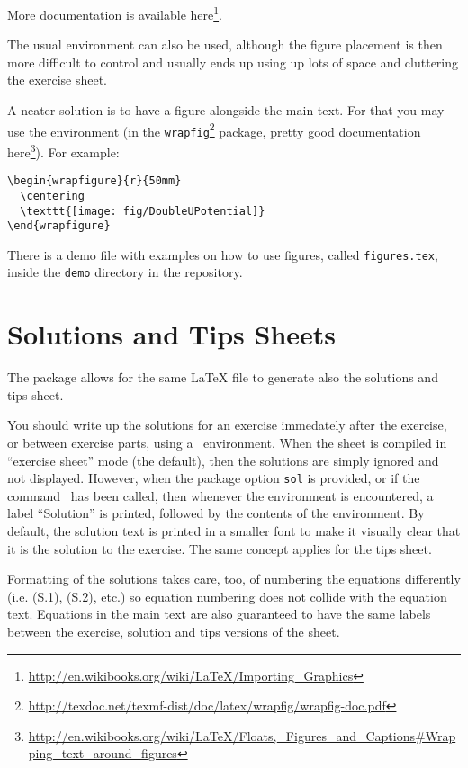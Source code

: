 \documentclass[11pt,a4paper]{article}
\begin{document}
More documentation is available
here\footnote{\url{http://en.wikibooks.org/wiki/LaTeX/Importing_Graphics}}.

The usual  environment can also be used, although the figure placement is
then more difficult to control and usually ends up using up lots of space and cluttering
the exercise sheet.

A neater solution is to have a figure alongside the main text. For that you may use the
 environment (in the
\texttt{wrapfig}\footnote{\url{http://texdoc.net/texmf-dist/doc/latex/wrapfig/wrapfig-doc.pdf}}
package, pretty good documentation
here\footnote{\url{http://en.wikibooks.org/wiki/LaTeX/Floats,_Figures_and_Captions\#Wrapping_text_around_figures}}).
For example:
\begin{pkgverbatim}
\begin{verbatim}
\begin{wrapfigure}{r}{50mm}
  \centering
  \texttt{[image: fig/DoubleUPotential]}
\end{wrapfigure}
\end{verbatim}
\end{pkgverbatim}

There is a demo file with examples on how to use figures, called \verb|figures.tex|,
inside the \verb|demo| directory in the \ethuebung{} repository.


\section{Solutions and Tips Sheets}
\label{sec:Solutions}

The package \ethuebung{} allows for the same \LaTeX{} file to generate also the solutions
and tips sheet.

You should write up the solutions for an exercise immedately after the exercise, or
between exercise parts, using a~ environment. When the sheet is compiled
in ``exercise sheet'' mode (the default), then the solutions are simply ignored and not
displayed. However, when the package option {\tt sol} is provided, or if the
command~ has been called, then whenever the environment
 is encountered, a label ``Solution'' is printed, followed by the
contents of the environment. By default, the solution text is printed in a smaller font to
make it visually clear that it is the solution to the exercise. The same concept applies
for the tips sheet.

Formatting of the solutions takes care, too, of numbering the equations differently
(i.e. (S.1), (S.2), etc.) so equation numbering does not collide with the equation
text. Equations in the main text are also guaranteed to have the same
labels between the exercise, solution and tips versions of the sheet.
\end{document}
